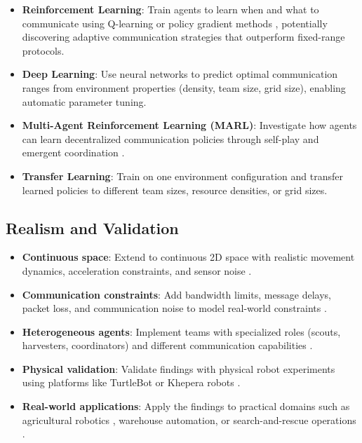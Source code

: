 \begin{itemize}
    \item \textbf{Reinforcement Learning}: Train agents to learn when and what to communicate using Q-learning or policy gradient methods \citep{panait2005cooperative}, potentially discovering adaptive communication strategies that outperform fixed-range protocols.

    \item \textbf{Deep Learning}: Use neural networks to predict optimal communication ranges from environment properties (density, team size, grid size), enabling automatic parameter tuning.

    \item \textbf{Multi-Agent Reinforcement Learning (MARL)}: Investigate how agents can learn decentralized communication policies through self-play and emergent coordination \citep{zhang2024}.

    \item \textbf{Transfer Learning}: Train on one environment configuration and transfer learned policies to different team sizes, resource densities, or grid sizes.
\end{itemize}

\subsection{Realism and Validation}

\begin{itemize}
    \item \textbf{Continuous space}: Extend to continuous 2D space with realistic movement dynamics, acceleration constraints, and sensor noise \citep{parker2008multiple}.

    \item \textbf{Communication constraints}: Add bandwidth limits, message delays, packet loss, and communication noise to model real-world constraints \citep{martorell2024}.

    \item \textbf{Heterogeneous agents}: Implement teams with specialized roles (scouts, harvesters, coordinators) and different communication capabilities \citep{balch1998behavioral}.

    \item \textbf{Physical validation}: Validate findings with physical robot experiments using platforms like TurtleBot or Khepera robots \citep{brambilla2013swarm}.

    \item \textbf{Real-world applications}: Apply the findings to practical domains such as agricultural robotics \citep{fountas2020agricultural}, warehouse automation, or search-and-rescue operations \citep{cao1997cooperative}.
\end{itemize}

